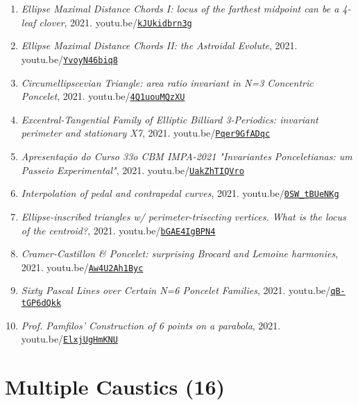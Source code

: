 \documentclass[12pt]{article}
\begin{document}
\begin{enumerate}[resume]
\item \textit{Ellipse Maximal Distance Chords I: locus of the farthest midpoint can be a 4-leaf clover}, 2021. youtu.be/\href{https://youtu.be/kJUkidbrn3g}{\nolinkurl{kJUkidbrn3g}}
\item \textit{Ellipse Maximal Distance Chords II: the Astroidal Evolute}, 2021. youtu.be/\href{https://youtu.be/YvoyN46biq8}{\nolinkurl{YvoyN46biq8}}
\item \textit{Circumellipscevian Triangle: area ratio invariant in N=3 Concentric Poncelet}, 2021. youtu.be/\href{https://youtu.be/4Q1uouMQzXU}{\nolinkurl{4Q1uouMQzXU}}
\item \textit{Excentral-Tangential Family of Elliptic Billiard 3-Periodics: invariant perimeter and stationary X7}, 2021. youtu.be/\href{https://youtu.be/Pqer9GfADqc}{\nolinkurl{Pqer9GfADqc}}
\item \textit{Apresentação do Curso 33o CBM IMPA-2021
"Invariantes Ponceletianas: um Passeio Experimental"}, 2021. youtu.be/\href{https://youtu.be/UakZhTIQVro}{\nolinkurl{UakZhTIQVro}}
\item \textit{Interpolation of pedal and contrapedal curves}, 2021. youtu.be/\href{https://youtu.be/0SW_tBUeNKg}{\nolinkurl{0SW\_tBUeNKg}}
\item \textit{Ellipse-inscribed triangles w/ perimeter-trisecting vertices. What is the locus of the centroid?}, 2021. youtu.be/\href{https://youtu.be/bGAE4IgBPN4}{\nolinkurl{bGAE4IgBPN4}}
\item \textit{Cramer-Castillon \& Poncelet: surprising Brocard and Lemoine harmonies}, 2021. youtu.be/\href{https://youtu.be/Aw4U2Ah1Byc}{\nolinkurl{Aw4U2Ah1Byc}}
\item \textit{Sixty Pascal Lines over Certain N=6 Poncelet Families}, 2021. youtu.be/\href{https://youtu.be/qB-tGP6dQkk}{\nolinkurl{qB-tGP6dQkk}}
\item \textit{Prof. Pamfilos' Construction of 6 points on a parabola}, 2021. youtu.be/\href{https://youtu.be/ElxjUgHmKNU}{\nolinkurl{ElxjUgHmKNU}}
\end{enumerate}

\section{Multiple Caustics (16)}
\end{document}
